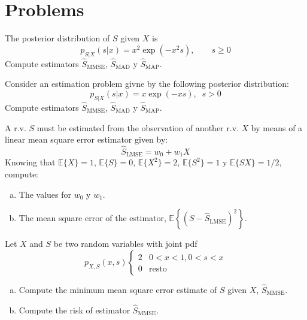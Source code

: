 
\section{Problems}

\begin{prob}
\label{MAPmulticlas1}

The posterior distribution of $S$ given $X$ is 
\[p_{S|X}(s|x) = x^2 \exp(-x^2 s), \qquad s\ge 0
\]
Compute estimators $\hat{S}_{\text{MMSE}}$, $\hat{S}_{\text{MAD}}$ y $\hat{S}_{\text{MAP}}$.

\end{prob}


\begin{prob}
\label{ProbSexponencial}

Consider an estimation problem givne by the following posterior distribution:
\begin{equation}
p_{S|{X}}(s|{x}) = x \exp({-x s}),\;\; s>0
\end{equation}
Compute estimators $\hat{S}_{\text{MMSE}}$, $\hat{S}_{\text{MAD}}$ y $\hat{S}_{\text{MAP}}$.

\end{prob}


\begin{prob}
\label{ProbEstLMSE}

A r.v. $S$ must be estimated from the observation of another r.v. $X$ by means of a linear mean square error estimator given by:
\[\hat S_{\text{LMSE}} = w_0 + w_1 X \]
Knowing that $\mathbb E \lbrace X \rbrace= 1$, $\mathbb E \lbrace S \rbrace= 0$, $\mathbb E \lbrace X^2 \rbrace= 2$, $\mathbb E \lbrace S^2 \rbrace= 1$ y $\mathbb E \lbrace SX \rbrace= 1/2$, compute:
\begin{enumerate}[a)]
\item The values for $w_0$ y $w_1$.
\item The mean square error of the estimator, $\mathbb E \left\lbrace  \left( S-\hat S_{\text{LMSE}}\right)^2 \right\rbrace$.
\end{enumerate}

\end{prob}


\begin{prob}
\label{ProbEstMSE+Sesgo}

Let $X$ and $S$ be two random variables with joint pdf
\[
p_{X,S}(x,s) \left \{ \begin{array}{ll} 2 & 0<x<1, 0<s<x\\ 0 & \mbox{resto} \end{array} \right.
\]
\begin{enumerate}[a)]
\item Compute the minimum mean square error estimate of $S$ given $X$, $\hat S_{\text{MMSE}}$.
\item Compute the risk of estimator $\hat S_\text{MMSE}$.
\end{enumerate}

\end{prob}


